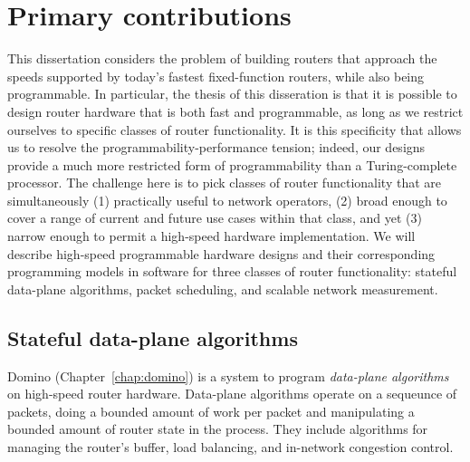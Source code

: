 \section{Primary contributions}

This dissertation considers the problem of building routers that approach the
speeds supported by today's fastest fixed-function routers, while also being
programmable. In particular, the thesis of this disseration is that it is
possible to design router hardware that is both fast and programmable, as long
as we restrict ourselves to specific classes of router functionality. It is
this specificity that allows us to resolve the programmability-performance
tension; indeed, our designs provide a much more restricted form of
programmability than a Turing-complete processor. The challenge here is to pick
classes of router functionality that are simultaneously (1) practically useful
to network operators, (2) broad enough to cover a range of current and future
use cases within that class, and yet (3) narrow enough to permit a high-speed
hardware implementation. We will describe high-speed programmable hardware
designs and their corresponding programming models in software for three
classes of router functionality: stateful data-plane algorithms, packet
scheduling, and scalable network measurement.

\subsection{Stateful data-plane algorithms}
Domino (Chapter~\ref{chap:domino}) is a system to program \textit{data-plane
algorithms} on high-speed router hardware. Data-plane algorithms operate on a
sequeunce of packets, doing a bounded amount of work per packet and
manipulating a bounded amount of router state in the process.  They include
algorithms for managing the router's buffer, load balancing, and in-network
congestion control.

